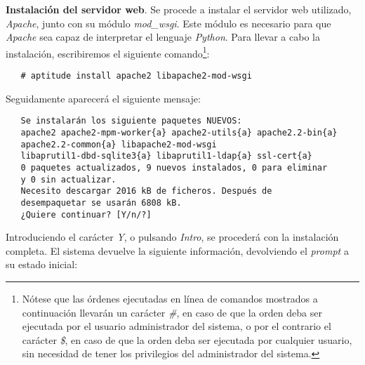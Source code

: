 \item \textbf{Instalación del servidor web}.
   Se procede a instalar el servidor web utilizado, \textit{Apache}, junto
   con su módulo \textit{mod\_wsgi}. Este módulo es necesario para que
   \textit{Apache} sea capaz de interpretar el lenguaje \textit{Python}. Para
   llevar a cabo la instalación, escribiremos el siguiente
   comando\footnote{Nótese que las órdenes ejecutadas en línea de
   comandos mostrados a continuación llevarán un carácter \textit{\#}, en caso
   de que la orden deba ser ejecutada por el usuario administrador del sistema,
   o por el contrario el carácter \textit{\$}, en caso de que la orden deba
   ser ejecutada por cualquier usuario, sin necesidad de tener los privilegios
   del administrador del sistema.}:

   \begin{verbatim}
   # aptitude install apache2 libapache2-mod-wsgi
   \end{verbatim}

   Seguidamente aparecerá el siguiente mensaje:

   \begin{verbatim}
   Se instalarán los siguiente paquetes NUEVOS:
   apache2 apache2-mpm-worker{a} apache2-utils{a} apache2.2-bin{a}
   apache2.2-common{a} libapache2-mod-wsgi
   libaprutil1-dbd-sqlite3{a} libaprutil1-ldap{a} ssl-cert{a}
   0 paquetes actualizados, 9 nuevos instalados, 0 para eliminar
   y 0 sin actualizar.
   Necesito descargar 2016 kB de ficheros. Después de
   desempaquetar se usarán 6808 kB.
   ¿Quiere continuar? [Y/n/?]
   \end{verbatim}

   Introduciendo el carácter \textit{Y}, o pulsando \textit{Intro}, se procederá
   con la instalación completa. El sistema devuelve la siguiente información,
   devolviendo el \textit{prompt} a su estado inicial:

